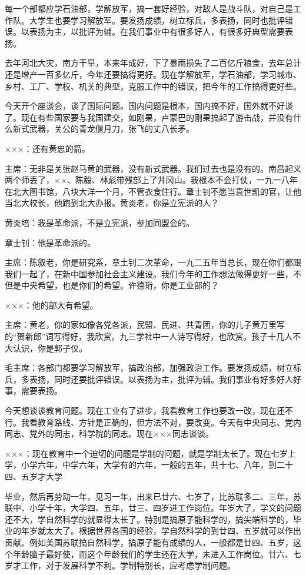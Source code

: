 每一个部都应学石油部，学解放军，搞一套好经验，对敌人是战斗队，对自己是工作队。大学生也要学习解放军。要发扬成绩，树立标兵，多表扬，同时也批评错误。以表扬为主，以批评为辅。在我们事业中有很多好人，有很多好典型需要表扬。

去年河北大灾，南方干旱，本来年成好，下了暴雨损失了二百亿斤粮食，去年总计还是增产一百多亿斤，今年还要搞得更好。现在学解放军，学石油部，学习城市、乡村、工厂、学校、机关的典型，克服工作中的错误，把今年的工作搞得更好些。

今天开个座谈会，谈了国际问题。国内问题是根本，国内搞不好，国外就不好谈了。现在有些国家要与我国建交，如刚果，卢蒙巴的刚果搞起了游击战，并没有什么新式武器，关公的青龙偃月刀，张飞的丈八长矛。

×××：还有黄忠的箭。

主席：无非是关张赵马黄的武器，没有新式武器。我们过去也是没有的。南昌起义两个师丢了，××、陈毅、林彪带残部上了井冈山。我根本不会打仗，一九一八年在北大图书馆，八块大洋一个月，不管衣食住行。章士钊不愿当袁世凯的官，让他当北大校长，他跑到北大办报。黄炎老，你是立宪派的人？

黄炎培：我是革命派，不是立宪派，参加同盟会的。

章士钊：他是革命派的。

主席：陈叙老，你是研究系，章土钊二次革命，一九二五年当总长，现在你们都跟我们一起了，在新中国参加社会主义建设。我们今年的工作想法做得更好一些，不但是中央希望，也是你们的希望。许德珩，你是工业部的？

×××：他的部大有希望。

主席：黄老，你的家如像各党各派，民盟、民进、共青团，你的儿子黄万里写的“贺新郎”词写得好，我欣赏。九三学社中一人诗写得好，也欣赏。孩子十几人不大认识，你是郭子仪。

毛主席：各部门都要学习解放军，搞政治部，加强政治工作。要发扬成绩，树立标兵，多表扬，同时还要批评错误。以表扬为主，批评为辅。我们事业有好多好人好事，需要表扬。

今天想谈谈教育问题。现在工业有了进步，我看教育工作也要改一改，现在还不行。我看教育路线、方针是正确的，但方法不对，要改变。今天有中央同志、党内同志、党外的同志，科学院的同志。现在×××同志谈谈。

×××：现在教育中一个迫切的问题是学制的问题，就是学制太长了。现在七岁上学，小学六年，中学六年，大学有的六年，一般的五年，共十七、八年，到二十四、五岁才大学

毕业，然后再劳动一年，见习一年，出来已廿六、七岁了，比苏联多二、三年，苏联中、小学十年，大学四、五年，廿三、四岁进工作岗位。年岁大了，学文的问题还不大，学自然科学的就显得太长了。特别是搞原子能科学的，搞尖端科学的，毕业的年岁就太大了。根据世界各国的经验，学自然科学的到廿四、五岁就可以作出贡献。例如美国苏联搞自然科学，搞原子能有成绩的人，一般都是廿四、五岁，这个年龄脑子最好使，而这个年龄我们的学生还在大学，未进入工作岗位。廿六、七岁才工作，对于发展科学不利。学制特别长，应考虑学制问题。

